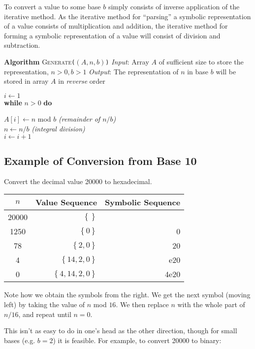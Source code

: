 \documentclass[12pt]{article}
\newcommand{\Lindent}{0.4in}
\newenvironment{Lalgorithm}[4]{
\textbf{Algorithm} \textsc{#1}\texttt{(#2)}\newline
\textit{Input}: #3\newline
\textit{Output}: #4\newline
}{}
\newcommand{\Lwhile}[2]{\textbf{while} #1 \textbf{do}\\\hspace*{\Lindent}\parbox{\textwidth}{#2}}
\begin{document}
To convert a value to some base $b$ simply consists of inverse application of the iterative method.  As the iterative method for ``parsing'' a symbolic representation of a value consists of multiplication and addition, the iterative method for forming a symbolic representation of a value will consist of division and subtraction.

\begin{Lalgorithm}
    {Generate}
    {$(A, n, b)$}
    {Array $A$ of sufficient size to store the representation, $n > 0, b > 1$}
    {The representation of $n$ in base $b$ will be stored in array $A$ in \textit{reverse} order}
$i \gets 1$\\
\Lwhile{$n > 0$}{
$A[i] \gets n$ mod $b$ \textit{(remainder of $n/b$)}\\
$n \gets n / b$ \textit{(integral division)}\\
$i \gets i + 1$}
\end{Lalgorithm}

\subsection*{Example of Conversion from Base 10}

Convert the decimal value 20000 to hexadecimal.

\begin{tabular}{|c|r|r|}
$n$ & Value Sequence & Symbolic Sequence \\
\hline
20000 & $\left\{\right\}$ & \\
1250 & $\left\{ 0 \right\}$ & 0 \\
78 & $\left\{ 2, 0 \right\}$ & 20 \\
4 & $\left\{ 14, 2, 0 \right\}$ & e20 \\
0 & $\left\{ 4, 14, 2, 0 \right\}$ & 4e20
\end{tabular}

Note how we obtain the symbols from the right.  We get the next symbol (moving left) by taking the value of $n$ mod $16$.  We then replace $n$ with the whole part of $n / 16$, and repeat until $n = 0$.

This isn't as easy to do in one's head as the other direction, though for small bases (e.g. $b = 2$) it is feasible.  For example, to convert 20000 to binary:
\end{document}
